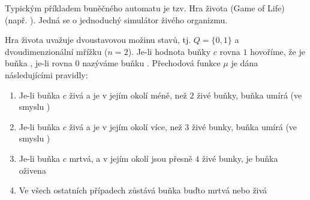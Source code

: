 \documentclass[a4paper,10pt]{article}
\begin{document}
\begin{example} \label{ex:GameOfLife}
  Typickým příkladem buněčného automatu je tzv. Hra života (Game of Life) (např. \cite{TofMar-CelAuMach+}). Jedná se o jednoduchý simulátor živého organizmu. 
  
  Hra života uvažuje dvoustavovou možinu stavů, tj. $Q = \{ 0, 1 \}$ a dvoudimenzionální mřížku ($n = 2$). Je-li hodnota buňky $c$ rovna $1$ hovoříme, že je buňka , je-li rovna $0$ nazýváme buňku . Přechodová funkce $\mu$ je dána následujícími pravidly:
  \begin{enumerate}
   \item Je-li buňka $c$ živá a je v jejím okolí méně, než $2$ živé buňky, buňka umírá (ve smyslu )
   \item Je-li buňka $c$ živá a je v jejím okolí více, než $3$ živé bunky, buňka umírá (ve smyslu )
   \item Je-li buňka $c$ mrtvá, a v jejím okolí jsou přesně $4$ živé bunky, je buňka oživena
   \item Ve všech ostatních případech zůstává buňka buďto mrtvá nebo živá 
  \end{enumerate}
%   
\end{example}
\end{document}
